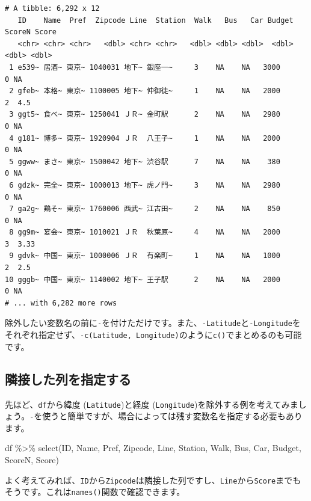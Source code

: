 \documentclass[
  a4paper,
  pandoc,
  ja=standard,
  jafont=haranoaji]{bxjsbook}
\newenvironment{Shaded}{\begin{snugshade}}{\end{snugshade}}
\newcommand{\FunctionTok}[1]{\textcolor[rgb]{0.28,0.35,0.67}{#1}}
\newcommand{\NormalTok}[1]{\textcolor[rgb]{0.00,0.48,0.65}{#1}}
\newcommand{\SpecialCharTok}[1]{\textcolor[rgb]{0.37,0.37,0.37}{#1}}
\begin{document}
\begin{verbatim}
# A tibble: 6,292 x 12
   ID    Name  Pref  Zipcode Line  Station  Walk   Bus   Car Budget ScoreN Score
   <chr> <chr> <chr>   <dbl> <chr> <chr>   <dbl> <dbl> <dbl>  <dbl>  <dbl> <dbl>
 1 e539~ 居酒~ 東京~ 1040031 地下~ 銀座一~     3    NA    NA   3000      0 NA   
 2 gfeb~ 本格~ 東京~ 1100005 地下~ 仲御徒~     1    NA    NA   2000      2  4.5 
 3 ggt5~ 食べ~ 東京~ 1250041 ＪＲ~ 金町駅      2    NA    NA   2980      0 NA   
 4 g181~ 博多~ 東京~ 1920904 ＪＲ  八王子~     1    NA    NA   2000      0 NA   
 5 ggww~ まさ~ 東京~ 1500042 地下~ 渋谷駅      7    NA    NA    380      0 NA   
 6 gdzk~ 完全~ 東京~ 1000013 地下~ 虎ノ門~     3    NA    NA   2980      0 NA   
 7 ga2g~ 鶏そ~ 東京~ 1760006 西武~ 江古田~     2    NA    NA    850      0 NA   
 8 gg9m~ 宴会~ 東京~ 1010021 ＪＲ  秋葉原~     4    NA    NA   2000      3  3.33
 9 gdvk~ 中国~ 東京~ 1000006 ＪＲ  有楽町~     1    NA    NA   1000      2  2.5 
10 gggb~ 中国~ 東京~ 1140002 地下~ 王子駅      2    NA    NA   2000      0 NA   
# ... with 6,282 more rows
\end{verbatim}

除外したい変数名の前に\texttt{-}を付けただけです。また、\texttt{-Latitude}と\texttt{-Longitude}をそれぞれ指定せず、\texttt{-c(Latitude,\ Longitude)}のように\texttt{c()}でまとめるのも可能です。

\hypertarget{ux96a3ux63a5ux3057ux305fux5217ux3092ux6307ux5b9aux3059ux308b}{%
\subsection{隣接した列を指定する}\label{ux96a3ux63a5ux3057ux305fux5217ux3092ux6307ux5b9aux3059ux308b}}

先ほど、\texttt{df}から緯度 (\texttt{Latitude})と経度
(\texttt{Longitude})を除外する例を考えてみましょう。\texttt{-}を使うと簡単ですが、場合によっては残す変数名を指定する必要もあります。

\begin{Shaded}
\begin{Highlighting}[numbers=left,,]
\NormalTok{df }\SpecialCharTok{\%\textgreater{}\%}
  \FunctionTok{select}\NormalTok{(ID, Name, Pref, Zipcode, }
\NormalTok{         Line, Station, Walk, Bus, Car, Budget, ScoreN, Score)}
\end{Highlighting}
\end{Shaded}

よく考えてみれば、\texttt{ID}から\texttt{Zipcode}は隣接した列ですし、\texttt{Line}から\texttt{Score}までもそうです。これは\texttt{names()}関数で確認できます。
\end{document}
